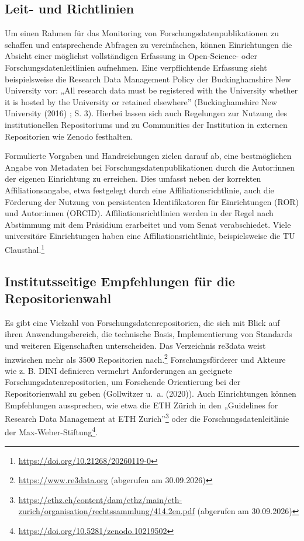 \documentclass[
  ngerman,
  letterpaper,
  DIV=11]{scrreprt}
\begin{document}
\subsection{Leit- und Richtlinien}\label{leit--und-richtlinien}

Um einen Rahmen für das Monitoring von Forschungsdatenpublikationen zu
schaffen und entsprechende Abfragen zu vereinfachen, können
Einrichtungen die Absicht einer möglichst vollständigen Erfassung in
Open-Science- oder Forschungsdatenleitlinien aufnehmen. Eine
verpflichtende Erfassung sieht beispielsweise die Research Data
Management Policy der Buckinghamshire New University vor: „All research
data must be registered with the University whether it is hosted by the
University or retained elsewhere'' (Buckinghamshire New University
(2016) ; S. 3). Hierbei lassen sich auch Regelungen zur Nutzung des
institutionellen Repositoriums und zu Communities der Institution in
externen Repositorien wie Zenodo festhalten.

Formulierte Vorgaben und Handreichungen zielen darauf ab, eine
bestmöglichen Angabe von Metadaten bei Forschungsdatenpublikationen
durch die Autor:innen der eigenen Einrichtung zu erreichen. Dies umfasst
neben der korrekten Affiliationsangabe, etwa festgelegt durch eine
Affiliationsrichtlinie, auch die Förderung der Nutzung von persistenten
Identifikatoren für Einrichtungen (ROR) und Autor:innen (ORCID).
Affiliationsrichtlinien werden in der Regel nach Abstimmung mit dem
Präsidium erarbeitet und vom Senat verabschiedet. Viele universitäre
Einrichtungen haben eine Affiliationsrichtlinie, beispielsweise die TU
Clausthal.\footnote{\url{https://doi.org/10.21268/20260119-0}}

\subsection{Institutsseitige Empfehlungen für die
Repositorienwahl}\label{institutsseitige-empfehlungen-fuxfcr-die-repositorienwahl}

Es gibt eine Vielzahl von Forschungsdatenrepositorien, die sich mit
Blick auf ihren Anwendungsbereich, die technische Basis, Implementierung
von Standards und weiteren Eigenschaften unterscheiden. Das Verzeichnis
re3data weist inzwischen mehr als 3500 Repositorien nach.\footnote{\href{https://www.re3data.org/}{https://www.re3data.org}
  (abgerufen am 30.09.2026)} Forschungsförderer und Akteure wie z. B.
DINI definieren vermehrt Anforderungen an geeignete
Forschungsdatenrepositorien, um Forschende Orientierung bei der
Repositorienwahl zu geben (Gollwitzer u.~a. (2020)). Auch Einrichtungen
können Empfehlungen aussprechen, wie etwa die ETH Zürich in den
„Guidelines for Research Data Management at ETH Zurich''\footnote{\url{https://ethz.ch/content/dam/ethz/main/eth-zurich/organisation/rechtssammlung/414.2en.pdf}
  (abgerufen am 30.09.2026)} oder die Forschungsdatenleitlinie der
Max-Weber-Stiftung\footnote{\url{https://doi.org/10.5281/zenodo.10219502}}.
\end{document}
